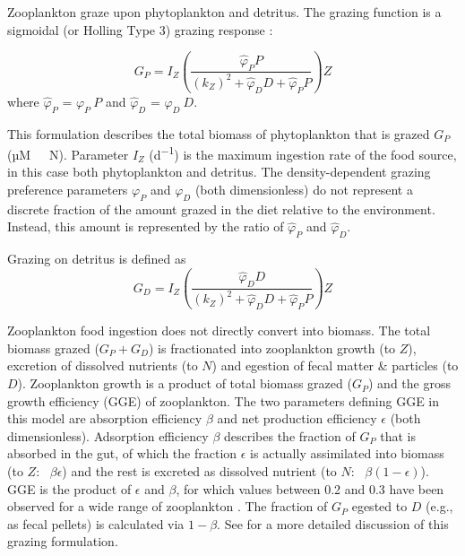 \documentclass[journal abbreviation, manuscript]{copernicus}
\begin{document}
Zooplankton graze upon phytoplankton and detritus. The grazing function is a sigmoidal (or Holling Type 3) grazing response \citep{Anderson2015c}:


\begin{equation}
    G_P = I_Z \left( \frac{ \hat{\varphi}_P P}{(k_Z)^2 + \hat{\varphi}_D D +\hat{\varphi}_P P}  \right) Z
\end{equation}
where $\hat{\varphi}_P$ = $\varphi_P \ P$ and $\hat{\varphi}_D$ = $\varphi_D \ D$.

This formulation describes the total biomass of phytoplankton that is grazed $G_P$ (\unit{µM \ N}). Parameter $I_Z$ (\unit{d^{-1}}) is the maximum ingestion rate of the food source, in this case both phytoplankton and detritus. The density-dependent grazing preference parameters $\varphi_P$ and $\varphi_D$ (both dimensionless) do not represent a discrete fraction of the amount grazed in the diet relative to the environment. Instead, this amount is represented by the ratio of $\hat{\varphi}_P$ and $\hat{\varphi}_D$.

Grazing on detritus is defined as
\begin{equation}
    G_D = I_Z \left( \frac{ \hat{\varphi}_D D}{(k_Z)^2 + \hat{\varphi}_D D +\hat{\varphi}_P P}  \right) Z
\end{equation}

Zooplankton food ingestion does not directly convert into biomass. The total biomass grazed ($G_P + G_D$) is fractionated into zooplankton growth (to $Z$), excretion of dissolved nutrients (to $N$) and egestion of fecal matter \& particles (to $D$). Zooplankton growth is a product of total biomass grazed ($G_P$) and the gross growth efficiency (GGE) of zooplankton. The two parameters defining GGE in this model are absorption efficiency $\beta$ and net production efficiency $\epsilon$ (both dimensionless). Adsorption efficiency $\beta$ describes the fraction of $G_P$ that is absorbed in the gut, of which the fraction $\epsilon$ is actually assimilated into biomass (to $Z$: \ $\beta \epsilon$) and the rest is excreted as dissolved nutrient (to $N$: \ $\beta (1-\epsilon)$). GGE is the product of $\epsilon$ and $\beta$, for which values between 0.2 and 0.3 have been observed for a wide range of zooplankton \citep{Straile1997GrossGroup}. The fraction of $G_P$ egested to $D$ (e.g., as fecal pellets) is calculated via $1-\beta$. See \citet{Anderson2015c} for a more detailed discussion of this grazing formulation.
\end{document}
